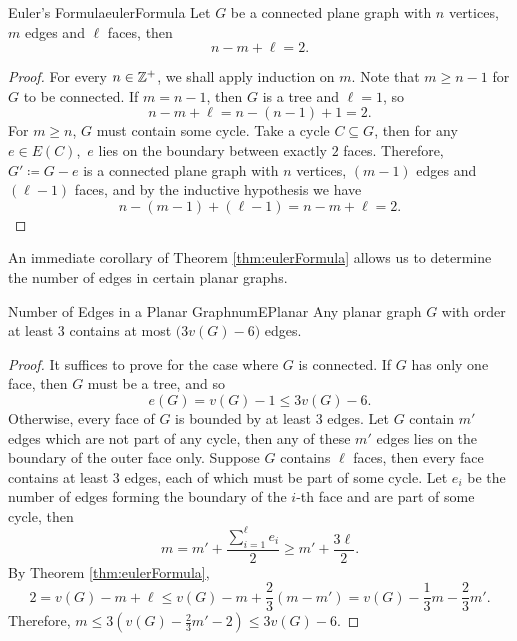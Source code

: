 \documentclass[math]{amznotes}
\theoremstyle{remark}
\begin{document}
\begin{thmbox}{Euler's Formula}{eulerFormula}
    Let $G$ be a connected plane graph with $n$ vertices, $m$ edges and $\ell$ faces, then 
    \begin{equation*}
        n - m + \ell = 2.
    \end{equation*}
    \tcblower
    \begin{proof}
        For every $n \in \mathbb{Z}^+$, we shall apply induction on $m$. Note that $m \geq n - 1$ for $G$ to be connected. If $m = n - 1$, then $G$ is a tree and $\ell = 1$, so 
        \begin{equation*}
            n - m + \ell = n - (n - 1) + 1 = 2.
        \end{equation*}
        For $m \geq n$, $G$ must contain some cycle. Take a cycle $C \subseteq G$, then for any $e \in E(C)$,~$e$ lies on the boundary between exactly $2$ faces. Therefore, $G' \coloneqq G - e$ is a connected plane graph with $n$ vertices, $(m - 1)$ edges and $(\ell - 1)$ faces, and by the inductive hypothesis we have 
        \begin{equation*}
            n - (m - 1) + (\ell - 1) = n - m + \ell = 2.
        \end{equation*}
    \end{proof}
\end{thmbox}
An immediate corollary of Theorem \ref{thm:eulerFormula} allows us to determine the number of edges in certain planar graphs.
\begin{corbox}{Number of Edges in a Planar Graph}{numEPlanar}
    Any planar graph $G$ with order at least $3$ contains at most $\bigl(3v(G) - 6\bigr)$ edges.
    \tcblower
    \begin{proof}
        It suffices to prove for the case where $G$ is connected. If $G$ has only one face, then $G$ must be a tree, and so 
        \begin{equation*}
            e(G) = v(G) - 1 \leq 3v(G) - 6.
        \end{equation*}
        Otherwise, every face of $G$ is bounded by at least $3$ edges. Let $G$ contain $m'$ edges which are not part of any cycle, then any of these $m'$ edges lies on the boundary of the outer face only. Suppose $G$ contains $\ell$ faces, then every face contains at least $3$ edges, each of which must be part of some cycle. Let $e_i$ be the number of edges forming the boundary of the $i$-th face and are part of some cycle, then 
        \begin{equation*}
            m = m' + \frac{\sum_{i = 1}^{\ell}e_i}{2} \geq m' + \frac{3\ell}{2}.
        \end{equation*}
        By Theorem \ref{thm:eulerFormula}, 
        \begin{equation*}
            2 = v(G) - m + \ell \leq v(G) - m + \frac{2}{3}\left(m - m'\right) = v(G) - \frac{1}{3}m - \frac{2}{3}m'.
        \end{equation*}
        Therefore, $m \leq 3\left(v(G) - \frac{2}{3}m' - 2\right) \leq 3v(G) - 6$.
    \end{proof}
\end{corbox}
\end{document}
